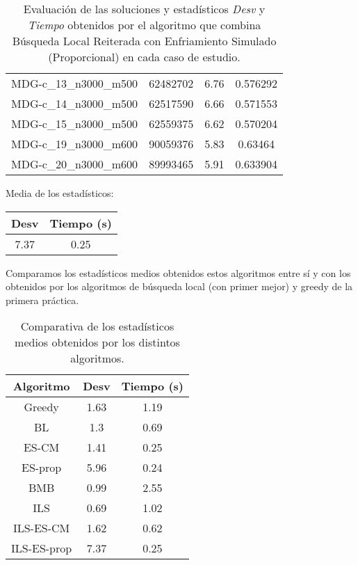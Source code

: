 \documentclass{article}
\begin{document}
\begin{table}[H]
\begin{tabular}{|cccc|}
		MDG-c\_13\_n3000\_m500 & 62482702 & 6.76 & 0.576292\\
		MDG-c\_14\_n3000\_m500 & 62517590 & 6.66 & 0.571553\\
		MDG-c\_15\_n3000\_m500 & 62559375 & 6.62 & 0.570204\\
		MDG-c\_19\_n3000\_m600 & 90059376 & 5.83 & 0.63464\\
		MDG-c\_20\_n3000\_m600 & 89993465 & 5.91 & 0.633904\\
		\hline
	\end{tabular}
	\caption{Evaluación de las soluciones y estadísticos \emph{Desv} y \emph{Tiempo} obtenidos por el algoritmo que combina
		Búsqueda Local Reiterada con Enfriamiento Simulado (Proporcional) en cada caso de estudio.}
	\label{tab:ils-es-proporcional}
\end{table}

Media de los estadísticos:
\begin{table}[H]
	\centering
	\begin{tabular}{|cc|}
		\hline
		Desv & Tiempo (s)\\ \hline
		7.37 & 0.25 \\
		\hline
	\end{tabular}
\end{table}

\pagebreak

Comparamos los estadísticos medios obtenidos estos algoritmos entre sí y con los obtenidos por los algoritmos
de búsqueda local (con primer mejor) y greedy de la primera práctica.

\begin{table}[H]
	\centering
	\begin{tabular}{|ccc|}
		\hline
		Algoritmo & Desv & Tiempo (s)\\ \hline
		Greedy & 1.63 & 1.19 \\
		BL & 1.3 & 0.69 \\
		ES-CM & 1.41 & 0.25 \\
		ES-prop & 5.96 & 0.24 \\
		BMB & 0.99 & 2.55 \\
		ILS & 0.69 & 1.02 \\
		ILS-ES-CM & 1.62 & 0.62 \\
		ILS-ES-prop & 7.37 & 0.25 \\
		\hline
	\end{tabular}
	\caption{Comparativa de los estadísticos medios obtenidos por los distintos algoritmos.}
	\label{tab:comparativa}
\end{table}
\end{document}
